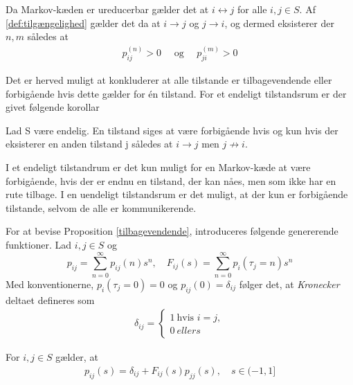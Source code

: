 \begin{bev} \textbf{} %
\newline
Da Markov-kæden er ureducerbar gælder det at $i \leftrightarrow j$ for alle $i,j \in S$. Af \autoref{def:tilgængelighed} gælder det da at $i \to j$ og $j \to i$, og dermed eksisterer der $n,m$ således at
\begin{align*}
    p_{ij}^{(n)} > 0 \quad \text{ og } \quad p_{ji}^{(m)} > 0
\end{align*}

\end{bev}

Det er herved muligt at konkluderer at alle tilstande er tilbagevendende eller forbigående hvis dette gælder for én tilstand. For et endeligt tilstandsrum er der givet følgende korollar

\begin{minipage}\textwidth
\begin{kor} \textbf{} \label{kor:forbigående}%
\newline
Lad S være endelig. En tilstand siges at være forbigående hvis og kun hvis der eksisterer en anden tilstand j således at $i \to j$ men $j \not\to i.$
\end{kor}
\end{minipage}


I et endeligt tilstandrum er det kun muligt for en Markov-kæde at være forbigående, hvis der er endnu en tilstand, der kan nåes, men som ikke har en rute tilbage. I en uendeligt tilstandsrum er det muligt, at der kun er forbigående tilstande, selvom de alle er kommunikerende. 

For at bevise Proposition \ref{tilbagevendende}, introduceres følgende genererende funktioner. Lad $i,j\in S$ og
$$p_{ij}=\sum_{n=0}^\infty p_{ij}(n)s^n, \quad F_{ij}(s)=\sum_{n=0}^\infty p_i(\tau_j=n)s^n$$
Med konventionerne, $p_i(\tau_j=0)=0$ og $p_{ij}(0)=\delta_{ij}$ følger det, at \textit{Kronecker} deltaet defineres som
\begin{align*}
    \delta_{ij}=\begin{cases}1\ \text{hvis } i=j,\\0\ ellers\end{cases}
\end{align*}


\begin{lem}\label{overgangssandynlighed Kronecker}
For $i,j\in S$ gælder, at
\begin{align*}
    p_{ij}(s)=\delta_{ij}+F_{ij}(s)p_{jj}(s),\quad s\in(-1,1]
\end{align*}
\end{lem}

